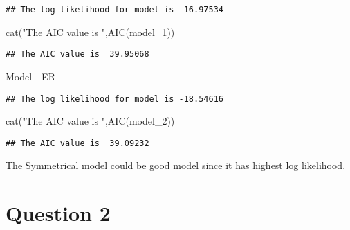 \documentclass[
]{article}
\newenvironment{Shaded}{\begin{snugshade}}{\end{snugshade}}
\newcommand{\AttributeTok}[1]{\textcolor[rgb]{0.77,0.63,0.00}{#1}}
\newcommand{\CommentTok}[1]{\textcolor[rgb]{0.56,0.35,0.01}{\textit{#1}}}
\newcommand{\FunctionTok}[1]{\textcolor[rgb]{0.00,0.00,0.00}{#1}}
\newcommand{\NormalTok}[1]{#1}
\newcommand{\OtherTok}[1]{\textcolor[rgb]{0.56,0.35,0.01}{#1}}
\newcommand{\SpecialCharTok}[1]{\textcolor[rgb]{0.00,0.00,0.00}{#1}}
\newcommand{\StringTok}[1]{\textcolor[rgb]{0.31,0.60,0.02}{#1}}
\begin{document}
\begin{verbatim}
## The log likelihood for model is -16.97534
\end{verbatim}

\begin{Shaded}
\begin{Highlighting}[]
\FunctionTok{cat}\NormalTok{(}\StringTok{"The AIC value is "}\NormalTok{,}\FunctionTok{AIC}\NormalTok{(model\_1))}
\end{Highlighting}
\end{Shaded}

\begin{verbatim}
## The AIC value is  39.95068
\end{verbatim}

Model - ER

\begin{Shaded}
\end{Shaded}

\begin{verbatim}
## The log likelihood for model is -18.54616
\end{verbatim}

\begin{Shaded}
\begin{Highlighting}[]
\FunctionTok{cat}\NormalTok{(}\StringTok{"The AIC value is "}\NormalTok{,}\FunctionTok{AIC}\NormalTok{(model\_2))}
\end{Highlighting}
\end{Shaded}

\begin{verbatim}
## The AIC value is  39.09232
\end{verbatim}

The Symmetrical model could be good model since it has highest log
likelihood.

\hypertarget{question-2}{%
\section{Question 2}\label{question-2}}
\end{document}
